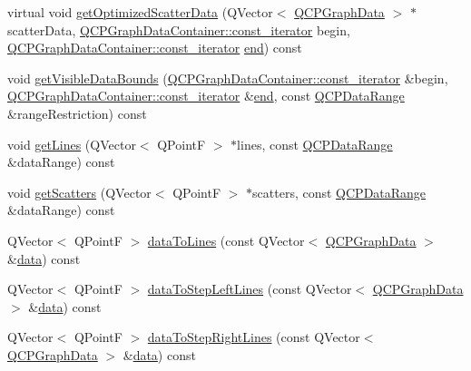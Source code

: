 \begin{DoxyCompactItemize}
\item 
virtual void \mbox{\hyperlink{class_q_c_p_graph_a5423245898537e375b9364cf26e89aea}{get\+Optimized\+Scatter\+Data}} (Q\+Vector$<$ \mbox{\hyperlink{class_q_c_p_graph_data}{Q\+C\+P\+Graph\+Data}} $>$ $\ast$scatter\+Data, \mbox{\hyperlink{class_q_c_p_data_container_ae40a91f5cb0bcac61d727427449b7d15}{Q\+C\+P\+Graph\+Data\+Container\+::const\+\_\+iterator}} begin, \mbox{\hyperlink{class_q_c_p_data_container_ae40a91f5cb0bcac61d727427449b7d15}{Q\+C\+P\+Graph\+Data\+Container\+::const\+\_\+iterator}} \mbox{\hyperlink{myutils_8h_a64d77caddefed4b96fa62e3f5f73c9a2}{end}}) const
\item 
void \mbox{\hyperlink{class_q_c_p_graph_a8599447a7f8cbbdcf0b94edcc11df560}{get\+Visible\+Data\+Bounds}} (\mbox{\hyperlink{class_q_c_p_data_container_ae40a91f5cb0bcac61d727427449b7d15}{Q\+C\+P\+Graph\+Data\+Container\+::const\+\_\+iterator}} \&begin, \mbox{\hyperlink{class_q_c_p_data_container_ae40a91f5cb0bcac61d727427449b7d15}{Q\+C\+P\+Graph\+Data\+Container\+::const\+\_\+iterator}} \&\mbox{\hyperlink{myutils_8h_a64d77caddefed4b96fa62e3f5f73c9a2}{end}}, const \mbox{\hyperlink{class_q_c_p_data_range}{Q\+C\+P\+Data\+Range}} \&range\+Restriction) const
\item 
void \mbox{\hyperlink{class_q_c_p_graph_a563c6da2126300a4d9d2bdee30dad040}{get\+Lines}} (Q\+Vector$<$ Q\+PointF $>$ $\ast$lines, const \mbox{\hyperlink{class_q_c_p_data_range}{Q\+C\+P\+Data\+Range}} \&data\+Range) const
\item 
void \mbox{\hyperlink{class_q_c_p_graph_a9d7ba5904fdcaca413222335d4b283c3}{get\+Scatters}} (Q\+Vector$<$ Q\+PointF $>$ $\ast$scatters, const \mbox{\hyperlink{class_q_c_p_data_range}{Q\+C\+P\+Data\+Range}} \&data\+Range) const
\item 
Q\+Vector$<$ Q\+PointF $>$ \mbox{\hyperlink{class_q_c_p_graph_a0085ee728fdd72a827c1e6ced4476363}{data\+To\+Lines}} (const Q\+Vector$<$ \mbox{\hyperlink{class_q_c_p_graph_data}{Q\+C\+P\+Graph\+Data}} $>$ \&\mbox{\hyperlink{class_q_c_p_graph_a141aa31a1f19bbd0ce60f55eaeb9ea60}{data}}) const
\item 
Q\+Vector$<$ Q\+PointF $>$ \mbox{\hyperlink{class_q_c_p_graph_a1f3e9e41fc67538c4940c74665840474}{data\+To\+Step\+Left\+Lines}} (const Q\+Vector$<$ \mbox{\hyperlink{class_q_c_p_graph_data}{Q\+C\+P\+Graph\+Data}} $>$ \&\mbox{\hyperlink{class_q_c_p_graph_a141aa31a1f19bbd0ce60f55eaeb9ea60}{data}}) const
\item 
Q\+Vector$<$ Q\+PointF $>$ \mbox{\hyperlink{class_q_c_p_graph_ab1fb6cb91d24a854f85bf54200f6d101}{data\+To\+Step\+Right\+Lines}} (const Q\+Vector$<$ \mbox{\hyperlink{class_q_c_p_graph_data}{Q\+C\+P\+Graph\+Data}} $>$ \&\mbox{\hyperlink{class_q_c_p_graph_a141aa31a1f19bbd0ce60f55eaeb9ea60}{data}}) const

\end{DoxyCompactItemize}
